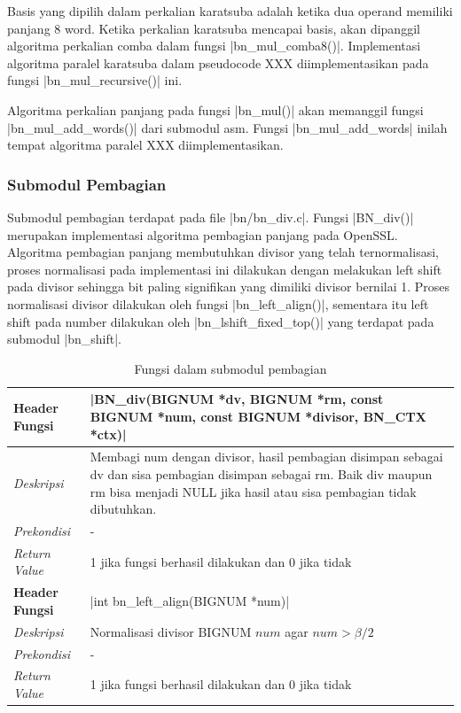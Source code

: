       Basis yang dipilih dalam perkalian karatsuba adalah ketika dua operand memiliki panjang 8 word. Ketika perkalian karatsuba mencapai basis, akan dipanggil algoritma perkalian comba dalam fungsi |bn_mul_comba8()|. Implementasi algoritma paralel karatsuba dalam pseudocode XXX diimplementasikan pada fungsi |bn_mul_recursive()| ini.

      Algoritma perkalian panjang pada fungsi |bn_mul()| akan memanggil fungsi |bn_mul_add_words()| dari submodul asm. Fungsi |bn_mul_add_words| inilah tempat algoritma paralel XXX diimplementasikan.

    \subsubsection{Submodul Pembagian}
      Submodul pembagian terdapat pada file |bn/bn_div.c|. Fungsi |BN_div()| merupakan implementasi algoritma pembagian panjang pada OpenSSL. Algoritma pembagian panjang membutuhkan divisor yang telah ternormalisasi, proses normalisasi pada implementasi ini dilakukan dengan melakukan left shift pada divisor sehingga bit paling signifikan yang dimiliki divisor bernilai 1. Proses normalisasi divisor dilakukan oleh fungsi |bn_left_align()|, sementara itu left shift pada number dilakukan oleh |bn_lshift_fixed_top()| yang terdapat pada submodul |bn_shift|.

      \begin{table}[h]
        \caption{Fungsi dalam submodul pembagian}
        \begin{tabular}{R{2.8cm}L{10.5cm}}
          \toprule
          \textbf{Header Fungsi} & |BN_div(BIGNUM *dv, BIGNUM *rm, const BIGNUM *num, const BIGNUM *divisor, BN_CTX *ctx)|                                                                                                       \\ \midrule
          \textit{Deskripsi}     & Membagi num dengan divisor, hasil pembagian disimpan sebagai dv dan sisa pembagian disimpan sebagai rm. Baik div maupun rm bisa menjadi NULL jika hasil atau sisa pembagian tidak dibutuhkan. \\
          \textit{Prekondisi}    & - \\
          \textit{Return Value}  & 1 jika fungsi berhasil dilakukan dan 0 jika tidak
          \\ \bottomrule
          \textbf{Header Fungsi} & |int bn_left_align(BIGNUM *num)|                                                                                                                                                              \\ \midrule
          \textit{Deskripsi}     & Normalisasi divisor BIGNUM $num$ agar $num > \beta/2$  \\
          \textit{Prekondisi}    & - \\
          \textit{Return Value}  & 1 jika fungsi berhasil dilakukan dan 0 jika tidak
          \\ \bottomrule
        \end{tabular}
      \end{table}

